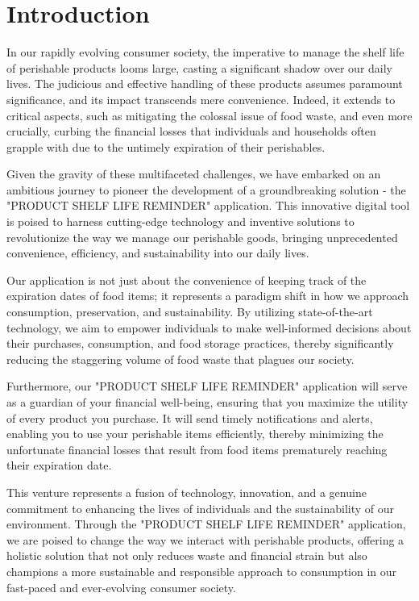 

\chapter{Introduction}\doublespacing

In our rapidly evolving consumer society, the imperative to manage the shelf life of perishable products looms large, casting a significant shadow over our daily lives. The judicious and effective handling of these products assumes paramount significance, and its impact transcends mere convenience. Indeed, it extends to critical aspects, such as mitigating the colossal issue of food waste, and even more crucially, curbing the financial losses that individuals and households often grapple with due to the untimely expiration of their perishables.

Given the gravity of these multifaceted challenges, we have embarked on an ambitious journey to pioneer the development of a groundbreaking solution - the "PRODUCT SHELF LIFE REMINDER" application. This innovative digital tool is poised to harness cutting-edge technology and inventive solutions to revolutionize the way we manage our perishable goods, bringing unprecedented convenience, efficiency, and sustainability into our daily lives.

Our application is not just about the convenience of keeping track of the expiration dates of food items; it represents a paradigm shift in how we approach consumption, preservation, and sustainability. By utilizing state-of-the-art technology, we aim to empower individuals to make well-informed decisions about their purchases, consumption, and food storage practices, thereby significantly reducing the staggering volume of food waste that plagues our society.

Furthermore, our "PRODUCT SHELF LIFE REMINDER" application will serve as a guardian of your financial well-being, ensuring that you maximize the utility of every product you purchase. It will send timely notifications and alerts, enabling you to use your perishable items efficiently, thereby minimizing the unfortunate financial losses that result from food items prematurely reaching their expiration date.

This venture represents a fusion of technology, innovation, and a genuine commitment to enhancing the lives of individuals and the sustainability of our environment. Through the "PRODUCT SHELF LIFE REMINDER" application, we are poised to change the way we interact with perishable products, offering a holistic solution that not only reduces waste and financial strain but also champions a more sustainable and responsible approach to consumption in our fast-paced and ever-evolving consumer society.

